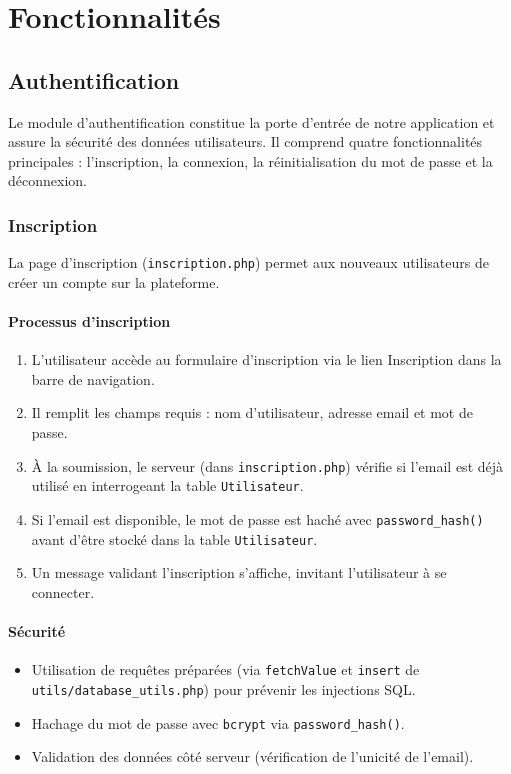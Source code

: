 \documentclass[a4paper,12pt]{article}
\begin{document}
\section{Fonctionnalités}

\subsection{Authentification}

Le module d'authentification constitue la porte d'entrée de notre application et assure la sécurité des données utilisateurs.
Il comprend quatre fonctionnalités principales : l'inscription, la connexion, la réinitialisation du mot de passe et la déconnexion.

\subsubsection{Inscription}

La page d'inscription (\texttt{inscription.php}) permet aux nouveaux utilisateurs de créer un compte sur la plateforme.

\paragraph{Processus d'inscription}

\begin{enumerate}
  \item L'utilisateur accède au formulaire d'inscription via le lien \og Inscription \fg{} dans la barre de navigation.
  \item Il remplit les champs requis : nom d'utilisateur, adresse email et mot de passe.
  \item À la soumission, le serveur (dans \texttt{inscription.php}) vérifie si l'email est déjà utilisé en interrogeant la table \texttt{Utilisateur}.
  \item Si l'email est disponible, le mot de passe est haché avec \texttt{password\_hash()} avant d’être stocké dans la table \texttt{Utilisateur}.
  \item Un message validant l'inscription s’affiche, invitant l’utilisateur à se connecter.
\end{enumerate}

\paragraph{Sécurité}

\begin{itemize}
  \item Utilisation de requêtes préparées (via \texttt{fetchValue} et \texttt{insert} de \texttt{utils/database\_utils.php}) pour prévenir les injections SQL.
  \item Hachage du mot de passe avec \texttt{bcrypt} via \texttt{password\_hash()}.
  \item Validation des données côté serveur (vérification de l'unicité de l'email).
\end{itemize}
\end{document}
